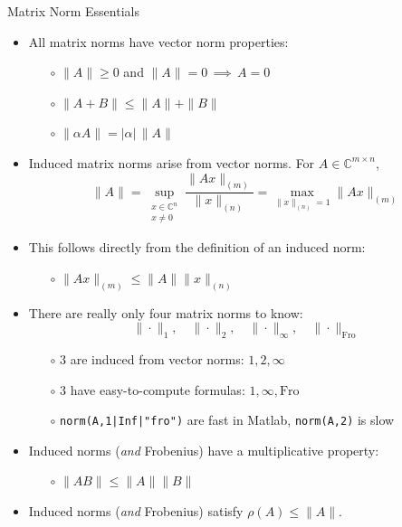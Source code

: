 \documentclass{amsart}
\newcommand{\CC}{\mathbb{C}}
\newcommand{\alert}[1]{{\color{red} #1}}
\begin{document}
\Huge
\centerline{Matrix Norm Essentials}

\thispagestyle{empty}

\bigskip\bigskip
\LARGE
\begin{itemize}
\setlength\itemsep{1em}
\item All matrix norms have \alert{vector norm properties}:
  \begin{itemize}
  \item[$\circ$] $\|A\| \ge 0$ and $\|A\|=0 \,\implies \,A=0$
  \item[$\circ$] $\|A+B\| \le \|A\| + \|B\|$
  \item[$\circ$] $\|\alpha A\| = |\alpha|\,\|A\|$
  \end{itemize}
\item \alert{Induced matrix norms} arise from vector norms.  For $A\in\CC^{m\times n}$,
	$$\|A\| = \sup_{\begin{smallmatrix} x\in\CC^n \\ x\ne 0 \end{smallmatrix}} \frac{\|Ax\|_{(m)}}{\|x\|_{(n)}} = \max_{\|x\|_{(n)}=1} \|Ax\|_{(m)}$$
\item This follows directly from the definition of an induced norm:
  \begin{itemize}
  \item[$\circ$] $\|Ax\|_{(m)} \le \|A\| \|x\|_{(n)}$
  \end{itemize}
\item There are really only \alert{four} matrix norms to know:
  $$\|\cdot\|_1, \quad \|\cdot\|_2, \quad \|\cdot\|_\infty, \quad \|\cdot\|_{\mathrm{Fro}}$$
  \begin{itemize}
  \item[$\circ$] 3 are \alert{induced} from vector norms: \quad $1,2,\infty$
  \item[$\circ$] 3 have \alert{easy-to-compute formulas}: \quad $1,\infty,\mathrm{Fro}$
  \item[$\circ$] {\Large \texttt{norm(A,1|Inf|"fro")}} are fast in Matlab, {\Large \texttt{norm(A,2)}} is slow
  \end{itemize}
\item Induced norms (\emph{and} Frobenius) have a \alert{multiplicative property}:
  \begin{itemize}
  \item[$\circ$] $\|A B\|\le \|A\|\|B\|$
  \end{itemize}
\item Induced norms (\emph{and} Frobenius) satisfy \alert{$\rho(A)\le \|A\|$}.
  \begin{itemize}

\end{itemize}
\end{itemize}
\end{document}
